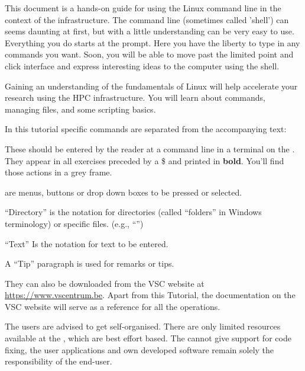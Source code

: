 This document is a hands-on guide for using the \gls{Linux} command line in the
context of the \strong{\university} \hpc infrastructure. The
command line (sometimes called 'shell') can seems daunting at first, but with a
little understanding can be very easy to use. Everything you do starts at the
prompt. Here you have the liberty to type in any commands you want. Soon, you
will be able to move past the limited point and click interface and express
interesting ideas to the computer using the shell.

Gaining an understanding of the fundamentals of Linux will help accelerate your
research using the HPC infrastructure.  You will learn about commands, managing
files, and some scripting basics.


In this tutorial specific commands are separated from the accompanying text:
\begin{prompt}
\end{prompt}

These should be entered by the reader at a command line in a terminal on the \hpcInfra. They appear in all exercises preceded by a \$ and printed in \textbf{bold}. You'll find those actions in a grey frame.

 are menus, buttons or drop down boxes to be pressed or selected.

``Directory'' is the notation for directories (called ``folders'' in
Windows terminology) or specific files. (e.g., ``\homedir'')

``Text'' Is the notation for text to be entered.

\begin{tip}
A ``Tip'' paragraph is used for remarks or tips.
\end{tip}

They can also be downloaded from the VSC website at
\url{https://www.vscentrum.be}.
Apart from this \hpc Tutorial, the documentation on the VSC website
will serve as a reference for all the
operations.


\begin{tip}
The users are advised to get self-organised. There are
only limited resources available at the \hpc, which are best effort based.
The \hpc cannot give support for code fixing, the user applications and own
developed software remain solely the responsibility of the end-user.
\end{tip}

